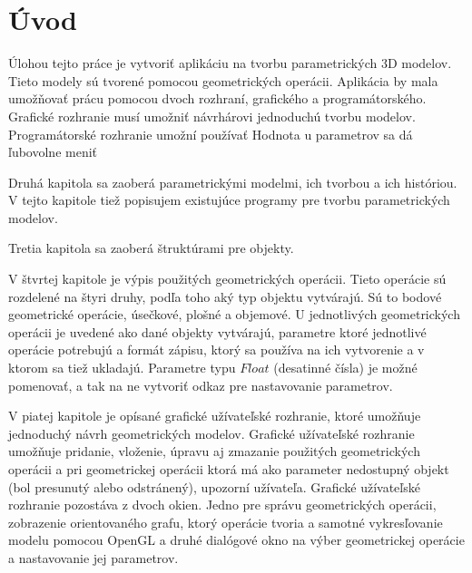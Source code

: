 

\chapter{Úvod}
Úlohou tejto práce je vytvoriť aplikáciu na tvorbu parametrických 3D modelov. Tieto modely sú tvorené pomocou geometrických operácii. Aplikácia by mala umožňovať prácu pomocou dvoch rozhraní, grafického a programátorského. Grafické rozhranie musí umožniť návrhárovi jednoduchú tvorbu modelov. Programátorské rozhranie umožní používať  Hodnota u parametrov sa dá ľubovolne meniť  

Druhá kapitola sa zaoberá parametrickými modelmi, ich tvorbou a ich históriou. V tejto kapitole tiež popisujem existujúce programy pre tvorbu parametrických modelov.

Tretia kapitola sa zaoberá štruktúrami pre objekty.

V štvrtej kapitole je výpis použitých geometrických operácii. Tieto operácie sú rozdelené na štyri druhy, podľa toho aký typ objektu vytvárajú. Sú to bodové geometrické operácie, úsečkové, plošné a objemové. U jednotlivých geometrických operácii je uvedené ako dané objekty vytvárajú, parametre ktoré jednotlivé operácie potrebujú a formát zápisu, ktorý sa používa na ich vytvorenie a v ktorom sa tiež ukladajú. Parametre typu $Float$ (desatinné čísla) je možné pomenovať, a tak na ne vytvoriť odkaz pre nastavovanie parametrov. 

V piatej kapitole je opísané grafické užívateľské rozhranie, ktoré umožňuje jednoduchý návrh geometrických modelov. Grafické užívateľské rozhranie umožňuje pridanie, vloženie, úpravu aj zmazanie použitých geometrických operácii a pri geometrickej operácii ktorá má ako parameter nedostupný objekt (bol presunutý alebo odstránený), upozorní užívateľa. Grafické užívateľské rozhranie pozostáva z dvoch okien. Jedno pre správu geometrických operácii, zobrazenie orientovaného grafu, ktorý operácie tvoria a samotné vykresľovanie modelu pomocou OpenGL a druhé dialógové okno na výber geometrickej operácie a nastavovanie jej parametrov. 

